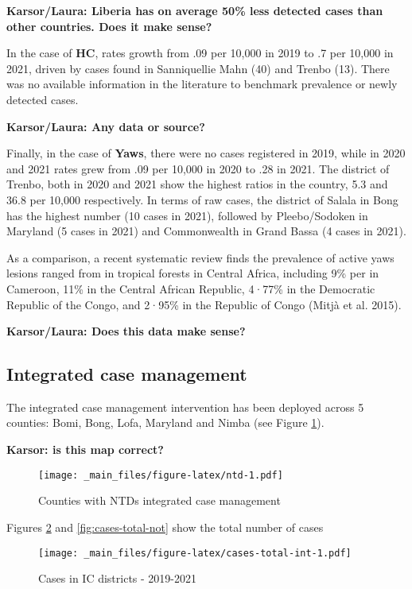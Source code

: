 \documentclass[
]{article}
\begin{document}
\textbf{Karsor/Laura: Liberia has on average 50\% less detected cases than other countries. Does it make sense?}

In the case of \textbf{HC}, rates growth from .09 per 10,000 in 2019 to .7 per 10,000 in 2021, driven by cases found in Sanniquellie Mahn (40) and Trenbo (13). There was no available information in the literature to benchmark prevalence or newly detected cases.

\textbf{Karsor/Laura: Any data or source?}

Finally, in the case of \textbf{Yaws}, there were no cases registered in 2019, while in 2020 and 2021 rates grew from .09 per 10,000 in 2020 to .28 in 2021. The district of Trenbo, both in 2020 and 2021 show the highest ratios in the country, 5.3 and 36.8 per 10,000 respectively. In terms of raw cases, the district of Salala in Bong has the highest number (10 cases in 2021), followed by Pleebo/Sodoken in Maryland (5 cases in 2021) and Commonwealth in Grand Bassa (4 cases in 2021).

As a comparison, a recent systematic review finds the prevalence of active yaws lesions ranged from in tropical forests in Central Africa, including 9\% per in Cameroon, 11\% in the Central African Republic, 4·77\% in the Democratic Republic of the Congo, and 2·95\% in the Republic of Congo (Mitjà et al. 2015).

\textbf{Karsor/Laura: Does this data make sense?}

\hypertarget{integrated-case-management}{%
\subsection{Integrated case management}\label{integrated-case-management}}

The integrated case management intervention has been deployed across 5 counties: Bomi, Bong, Lofa, Maryland and Nimba (see Figure \ref{fig:ntd}).

\textbf{Karsor: is this map correct?}

\begin{figure}
\centering
\texttt{[image: \_main\_files/figure-latex/ntd-1.pdf]}
\caption{\label{fig:ntd}Counties with NTDs integrated case management}
\end{figure}

Figures \ref{fig:cases-total-int} and \ref{fig:cases-total-not} show the total number of cases

\begin{figure}
\centering
\texttt{[image: \_main\_files/figure-latex/cases-total-int-1.pdf]}
\caption{\label{fig:cases-total-int}Cases in IC districts - 2019-2021}
\end{figure}
\end{document}
